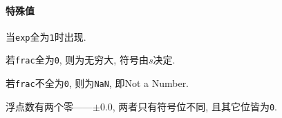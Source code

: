 \documentclass{ctexart}
\def\binaryseq#1{{\texttt{#1}}}
\begin{document}

\paragraph{特殊值} %
\label{par:特殊值}

当\colorbox{expgreencolor}{\texttt{exp}}全为\binaryseq{1}时出现.
\begin{cenum}
    \item 若\colorbox{significandcolor}{\texttt{frac}}全为\binaryseq{0}, 则为无穷大, 符号由$s$决定.
    \item 若\colorbox{significandcolor}{\texttt{frac}}不全为\binaryseq{0}, 则为\binaryseq{NaN}, 即Not a Number.
\end{cenum}


\begin{remark}
    浮点数有两个零——$\pm 0.0$, 两者只有符号位不同, 且其它位皆为\binaryseq{0}.
\end{remark}



\end{document}
